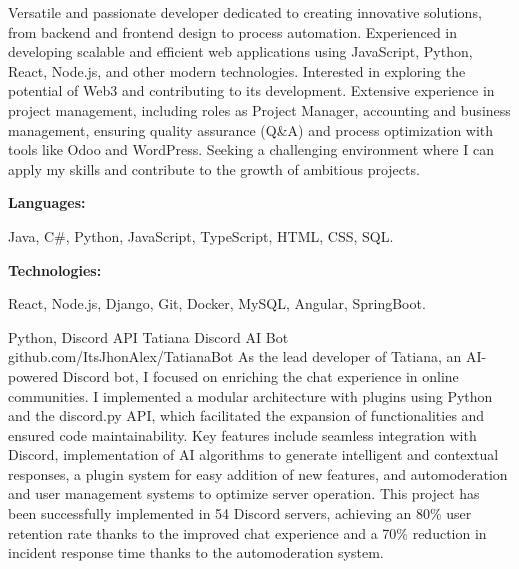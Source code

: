 \documentclass[9pt]{developercv}
\begin{document}
\begin{minipage}[t]{0.46\textwidth}
	\vspace{-6pt}
 
    Versatile and passionate developer dedicated to creating innovative solutions, from backend and frontend design to process automation. Experienced in developing scalable and efficient web applications using JavaScript, Python, React, Node.js, and other modern technologies. Interested in exploring the potential of Web3 and contributing to its development. Extensive experience in project management, including roles as Project Manager, accounting and business management, ensuring quality assurance (Q\&A) and process optimization with tools like Odoo and WordPress. Seeking a challenging environment where I can apply my skills and contribute to the growth of ambitious projects.
\end{minipage}
\hfill
\begin{minipage}[t]{0.465\textwidth}
    \vspace{-6pt}
    
    \begin{minipage}[t]{0.2\textwidth}
        \textbf{Languages:}
    \end{minipage}
    \hfill
    \begin{minipage}[t]{0.73\textwidth}
      Java, C\#, Python, JavaScript, TypeScript, HTML, CSS, SQL.  
    \end{minipage}
    \vspace{4mm}
    
    \begin{minipage}[t]{0.2\textwidth}
        \textbf{Technologies:}
    \end{minipage}
    \hfill
    \begin{minipage}[t]{0.73\textwidth}
      React, Node.js, Django, Git, Docker, MySQL, Angular, SpringBoot.
    \end{minipage}
    
\end{minipage}

\begin{entrylist}
    \entry
		{Python, Discord API}
		{Tatiana Discord AI Bot}
		{github.com/ItsJhonAlex/TatianaBot}
		{As the lead developer of Tatiana, an AI-powered Discord bot, I focused on enriching the chat experience in online communities. I implemented a modular architecture with plugins using Python and the discord.py API, which facilitated the expansion of functionalities and ensured code maintainability. Key features include seamless integration with Discord, implementation of AI algorithms to generate intelligent and contextual responses, a plugin system for easy addition of new features, and automoderation and user management systems to optimize server operation. This project has been successfully implemented in 54 Discord servers, achieving an 80\% user retention rate thanks to the improved chat experience and a 70\% reduction in incident response time thanks to the automoderation system.}

\end{entrylist}
\end{document}
